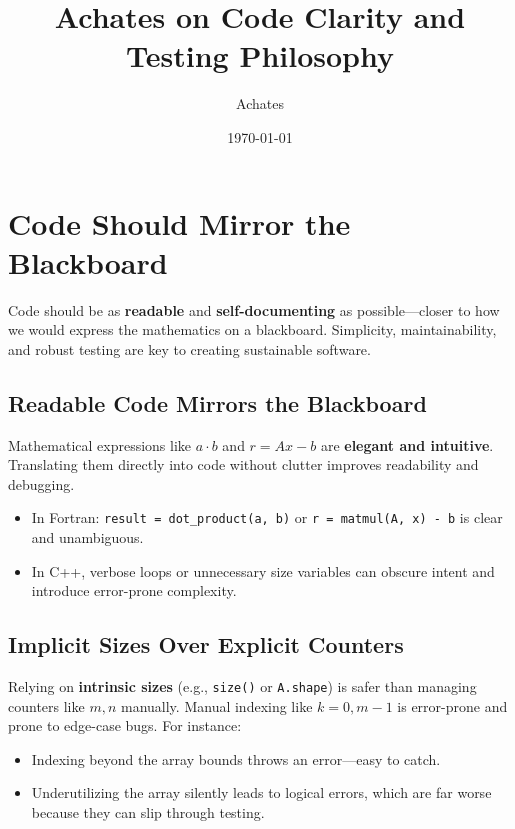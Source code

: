 \documentclass[12pt]{article}
\title{\textbf{Achates on Code Clarity and Testing Philosophy}}
\author{Achates}
\date{\today}
\begin{document}
\maketitle



\section*{Code Should Mirror the Blackboard}



Code should be as \textbf{readable} and \textbf{self-documenting} as possible---closer to how we would express the mathematics on a blackboard. Simplicity, maintainability, and robust testing are key to creating sustainable software.



\subsection*{Readable Code Mirrors the Blackboard}

Mathematical expressions like \( a \cdot b \) and \( r = Ax - b \) are \textbf{elegant and intuitive}. Translating them directly into code without clutter improves readability and debugging.

\begin{itemize}

    \item In Fortran: \texttt{result = dot\_product(a, b)} or \texttt{r = matmul(A, x) - b} is clear and unambiguous.

    \item In C++, verbose loops or unnecessary size variables can obscure intent and introduce error-prone complexity.

\end{itemize}



\subsection*{Implicit Sizes Over Explicit Counters}

Relying on \textbf{intrinsic sizes} (e.g., \texttt{size()} or \texttt{A.shape}) is safer than managing counters like \(m, n\) manually. Manual indexing like \(k = 0, m-1\) is error-prone and prone to edge-case bugs. For instance:

\begin{itemize}

    \item Indexing beyond the array bounds throws an error---easy to catch.

    \item Underutilizing the array silently leads to logical errors, which are far worse because they can slip through testing.

\end{itemize}
\end{document}
